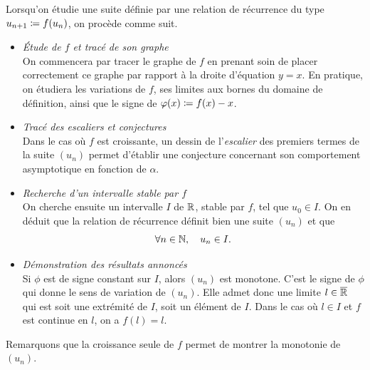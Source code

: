 \documentclass{magnolia}
\begin{document}
\begin{remarques}
\remarque
Lorsqu'on étudie une suite définie par une relation de récurrence du type $u_{n+1}\coloneqq f(u_n)$, on procède comme suit.
  \begin{itemize}
  \item \emph{Étude de $f$ et tracé de son graphe}\\
    On commencera par tracer le graphe de $f$ en prenant soin de placer correctement ce graphe par rapport à la droite d'équation $y=x$. En pratique, on étudiera les variations de $f$, ses limites aux bornes du domaine de définition, ainsi que le signe de $\varphi(x)\coloneqq f(x)-x$.
  \item \emph{Tracé des escaliers et conjectures}\\
    Dans le cas où $f$ est croissante, un dessin de l'\emph{escalier} des premiers termes de la suite $(u_n)$ permet d'établir une conjecture concernant son comportement asymptotique en fonction de $\alpha$.
  \item \emph{Recherche d'un intervalle stable par $f$}\\
    On cherche ensuite un intervalle $I$ de $\mathbb{R}$, stable par $f$, tel que $u_0\in I$.
    On en déduit que la relation de récurrence définit bien une suite $(u_n)$ et que
    \[\forall n\in\mathbb{N},\quad u_n\in I.\]
  \item \emph{Démonstration des résultats annoncés}\\
    Si $\phi$ est de signe constant sur $I$, alors $(u_n)$ est monotone. C'est
    le signe de $\phi$ qui donne le sens de variation de $(u_n)$. Elle admet donc une limite
    $l\in\overline{\mathbb{R}}$ qui est soit une extrémité de $I$, soit un élément de $I$. Dans le cas où
    $l\in I$ et $f$ est continue en $l$, on a $f(l)=l$.
  \end{itemize}
\remarque Remarquons que la croissance seule de $f$ permet de montrer la monotonie de
  $(u_n)$.
\end{remarques}
\end{document}
